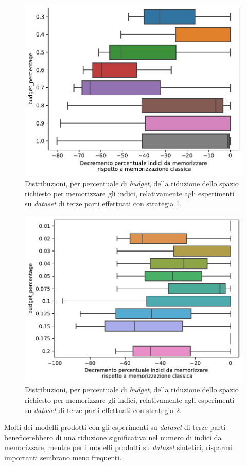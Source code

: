 \begin{figure}
    \centering
    \includegraphics[width=.7\linewidth]{img/decremento_spazio_indici_TP_old.pdf}
    \caption{Distribuzioni, per percentuale di \emph{budget}, della riduzione dello spazio richiesto per memorizzare gli indici, relativamente agli esperimenti su \emph{dataset} di terze parti effettuati con strategia 1.}
    \label{fig:dist_riduzione_TP_old}
\end{figure}%
\begin{figure}
    \centering
    \includegraphics[width=.7\linewidth]{img/decremento_spazio_indici_TP_new.pdf}
    \caption{Distribuzioni, per percentuale di \emph{budget}, della riduzione dello spazio richiesto per memorizzare gli indici, relativamente agli esperimenti su \emph{dataset} di terze parti effettuati con strategia 2.}
    \label{fig:dist_riduzione_TP_new}
\end{figure}
Molti dei modelli prodotti con gli esperimenti su \emph{dataset} di terze parti beneficerebbero di una riduzione significativa nel numero di indici da memorizzare, mentre per i modelli prodotti su \emph{dataset} sintetici, risparmi importanti sembrano meno frequenti.
